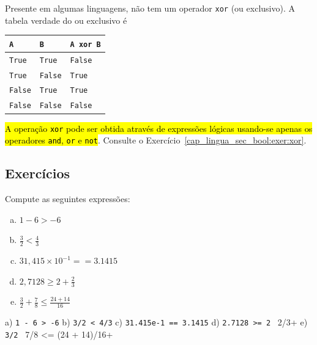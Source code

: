 \begin{obs}\label{cap_lingua_sec_bool:obs:xor}
  Presente em algumas linguagens, {\python} não tem um operador \lstinline+xor+ (ou exclusivo). A tabela verdade do ou exclusivo é
  \begin{center}
    \begin{tabular}[H]{ll|l}
      \lstinline+A+ & \lstinline+B+ & \lstinline+A xor B+\\\hline
      \lstinline+True+ & \lstinline+True+ & \lstinline+False+\\
      \lstinline+True+ & \lstinline+False+ & \lstinline+True+\\
      \lstinline+False+ & \lstinline+True+ & \lstinline+True+\\
      \lstinline+False+ & \lstinline+False+ & \lstinline+False+\\\hline    
    \end{tabular}
  \end{center}
  \hl{A operação {\lstinline+xor+} pode ser obtida através de expressões lógicas usando-se apenas os operadores {\lstinline+and+}, {\lstinline+or+} e {\lstinline+not+}}. Consulte o Exercício~\ref{cap_lingua_sec_bool:exer:xor}.
\end{obs}

\subsection{Exercícios}

\begin{exer}
  Compute as seguintes expressões:
  \begin{enumerate}[a)]
  \item $1 - 6 > -6$\\
  \item $\frac{3}{2} < \frac{4}{3}$\\
  \item $31,415\times 10^{-1} == 3.1415$\\
  \item $\displaystyle 2,7128 \geq 2 + \frac{2}{3}$
  \item $\displaystyle \frac{3}{2} + \frac{7}{8} \leq \frac{24 + 14}{16}$
  \end{enumerate}
\end{exer}
\begin{resp}
  a) \lstinline+1 - 6 > -6+ b) \lstinline+3/2 < 4/3+ c) \lstinline+31.415e-1 == 3.1415+ d) \lstinline+2.7128 >= 2 + 2/3+ e) \lstinline+3/2 + 7/8 <= (24 + 14)/16+
\end{resp}

